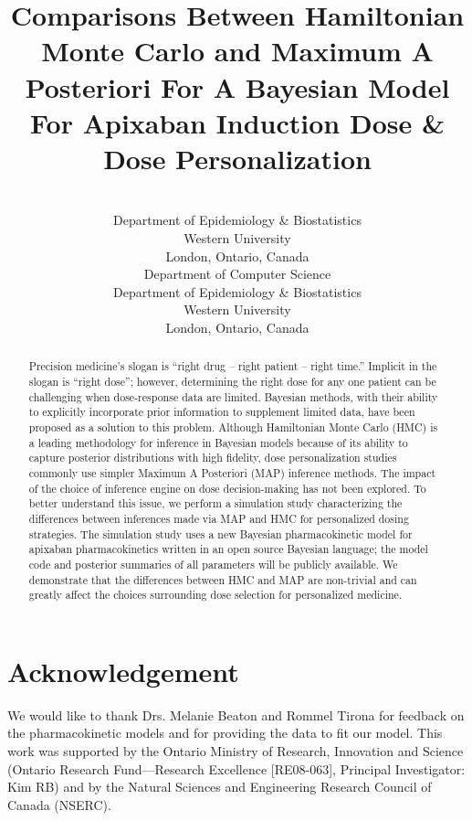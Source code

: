 \documentclass[pmlr]{jmlr}%
\title[Comparisons Between HMC And MAP For  Dose Personalization]{Comparisons Between Hamiltonian Monte Carlo and Maximum A Posteriori For A Bayesian Model For Apixaban Induction Dose \& Dose Personalization}
\author{\Name{A. Demetri Pananos}
       \Email{apananos@uwo.ca}\\ 
       \addr Department of Epidemiology \& Biostatistics\\
       Western University\\
		London, Ontario, Canada
       \AND
       \Name{Daniel J. Lizotte}
       \Email{dlizotte@uwo.ca}\\ 
       \addr 
       Department of Computer Science\\
       Department of Epidemiology \& Biostatistics\\
       Western University\\
       London, Ontario, Canada}
\begin{document}
\maketitle

\begin{abstract}
Precision medicine’s slogan is “right drug -- right patient -- right time.” Implicit in the slogan is ``right dose''; however, determining the right dose for any one patient can be challenging when dose-response data are limited. Bayesian methods, with their ability to explicitly incorporate prior information to supplement limited data, have been proposed as a solution to this problem. Although Hamiltonian Monte Carlo (HMC) is a leading methodology for inference in Bayesian models because of its ability to capture posterior distributions with high fidelity, dose personalization studies commonly use simpler Maximum A Posteriori (MAP) inference methods. The impact of the choice of inference engine on dose decision-making has not been explored.   To better understand this issue, we perform a simulation study characterizing the differences between inferences made via MAP and HMC for personalized dosing strategies. The simulation study uses a new Bayesian pharmacokinetic model for apixaban pharmacokinetics written in an open source Bayesian language; the model code and posterior summaries of all parameters will be publicly available. We demonstrate that the differences between HMC and MAP are non-trivial and can greatly affect the choices surrounding dose selection for personalized medicine.

\end{abstract}







\section*{Acknowledgement}

We would like to thank Drs. Melanie Beaton and Rommel Tirona for feedback on the pharmacokinetic models and for providing the data to fit our model.  This work was supported by the Ontario Ministry of Research, Innovation and Science (Ontario Research Fund---Research Excellence [RE08-063], Principal Investigator: Kim RB) and by the Natural Sciences and Engineering Research Council of Canada (NSERC).




\newpage


\end{document}
